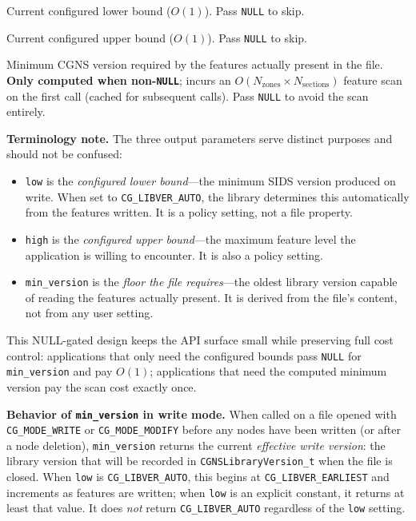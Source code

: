 \documentclass[11pt,letterpaper]{article}
\begin{document}
\begin{description}[leftmargin=2em, font=\normalfont\ttfamily]
\item[low] Current configured lower bound ($O(1)$).  Pass
  \texttt{NULL} to skip.
\item[high] Current configured upper bound ($O(1)$).  Pass
  \texttt{NULL} to skip.
\item[min\_version] Minimum CGNS version required by the features
  actually present in the file.  \textbf{Only computed when
  non-\texttt{NULL}}; incurs an
  $O(N_{\mathrm{zones}} \times N_{\mathrm{sections}})$ feature scan
  on the first call (cached for subsequent calls).  Pass \texttt{NULL}
  to avoid the scan entirely.
\end{description}

\textbf{Terminology note.}  The three output parameters serve distinct
purposes and should not be confused:
\begin{itemize}[leftmargin=2em]
\item \texttt{low} is the \emph{configured lower bound}---the minimum
  SIDS version produced on write.  When set to
  \texttt{CG\_LIBVER\_AUTO}, the library determines this automatically
  from the features written.  It is a policy setting, not a file
  property.
\item \texttt{high} is the \emph{configured upper bound}---the maximum
  feature level the application is willing to encounter.  It is also
  a policy setting.
\item \texttt{min\_version} is the \emph{floor the file requires}---the
  oldest library version capable of reading the features actually
  present.  It is derived from the file's content, not from any user
  setting.
\end{itemize}

This NULL-gated design keeps the API surface small while preserving
full cost control: applications that only need the configured bounds
pass \texttt{NULL} for \texttt{min\_version} and pay $O(1)$;
applications that need the computed minimum version pay the scan cost
exactly once.

\textbf{Behavior of \texttt{min\_version} in write mode.}
When called on a file opened with \texttt{CG\_MODE\_WRITE} or
\texttt{CG\_MODE\_MODIFY} before any nodes have been written (or
after a node deletion), \texttt{min\_version} returns the current
\emph{effective write version}: the library version that will be
recorded in \texttt{CGNSLibraryVersion\_t} when the file is closed.
When \texttt{low} is \texttt{CG\_LIBVER\_AUTO}, this begins at
\texttt{CG\_LIBVER\_EARLIEST} and increments as features are
written; when \texttt{low} is an explicit constant, it returns at
least that value.  It does \emph{not} return
\texttt{CG\_LIBVER\_AUTO} regardless of the \texttt{low} setting.
\end{document}
